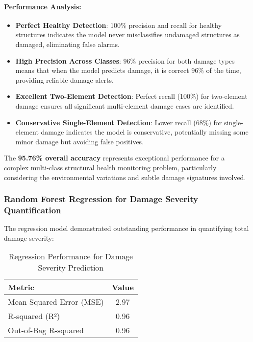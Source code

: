 \documentclass[11pt,a4paper]{article}
\begin{document}
\paragraph{Performance Analysis:}

\begin{itemize}
    \item \textbf{Perfect Healthy Detection}: 100\% precision and recall for healthy structures indicates the model never misclassifies undamaged structures as damaged, eliminating false alarms.
    
    \item \textbf{High Precision Across Classes}: 96\% precision for both damage types means that when the model predicts damage, it is correct 96\% of the time, providing reliable damage alerts.
    
    \item \textbf{Excellent Two-Element Detection}: Perfect recall (100\%) for two-element damage ensures all significant multi-element damage cases are identified.
    
    \item \textbf{Conservative Single-Element Detection}: Lower recall (68\%) for single-element damage indicates the model is conservative, potentially missing some minor damage but avoiding false positives.
\end{itemize}

The \textbf{95.76\% overall accuracy} represents exceptional performance for a complex multi-class structural health monitoring problem, particularly considering the environmental variations and subtle damage signatures involved.

\subsubsection{Random Forest Regression for Damage Severity Quantification}

The regression model demonstrated outstanding performance in quantifying total damage severity:

\begin{table}[H]
\centering
\begin{tabular}{lc}
\toprule
\textbf{Metric} & \textbf{Value} \\
\midrule
Mean Squared Error (MSE) & 2.97 \\
R-squared (R²) & 0.96 \\
Out-of-Bag R-squared & 0.96 \\
\bottomrule
\end{tabular}
\caption{Regression Performance for Damage Severity Prediction}
\label{tab:regression_results}
\end{table}
\end{document}

